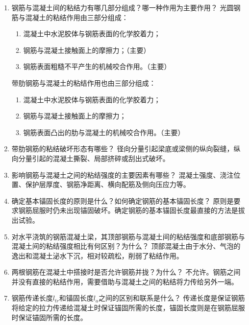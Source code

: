 \documentclass{article}
\begin{document}
\begin{enumerate}
\begin{enumerate}[1.]
                  \item 钢筋与混凝土间的粘结力有哪几部分组成？哪一种作用为主要作用？
                        \ans  光圆钢筋与混凝土的粘结作用由三部分组成：\begin{enumerate}
                              \item 混凝土中水泥胶体与钢筋表面的化学胶着力；
                              \item 钢筋与混凝土接触面上的摩擦力；（主要）
                              \item 钢筋表面粗糙不平产生的机械咬合作用。（主要）
                        \end{enumerate}
                        \par 带肋钢筋与混凝土的粘结作用也由三部分组成：\begin{enumerate}
                              \item 混凝土中水泥胶体与钢筋表面的化学胶着力；
                              \item 钢筋与混凝土接触面上的摩擦力；
                              \item 钢筋表面凸出的肋与混凝土的机械咬合作用。（主要）
                        \end{enumerate}
                  \item 带肋钢筋的粘结破坏形态有哪些？
                        \ans  径向分量引起梁底或梁侧的纵向裂缝，纵向分量引起的混凝土撕裂、局部挤碎或刮出式破坏。
                  \item 影响钢筋与混凝土之间的粘结强度的主要因素有哪些？
                        \ans  混凝土强度、浇注位置、保护层厚度、钢筋净距离、横向配筋及侧向压应力等。
                  \item 确定基本锚固长度的原则是什么？如何确定钢筋的基本锚固长度？
                        \ans  原则是要求钢筋屈服时仍未出现锚固破坏。确定钢筋的基本锚固长度最直接的方法是拔出试验。
                  \item 对水平浇筑的钢筋混凝土梁，其顶部钢筋与混凝土间的粘结强度和底部钢筋与混凝土间的粘结强度相比有何区别？为什么？
                        \ans 顶部混凝土由于水分、气泡的逸出和混凝土泌水下沉，相对较疏松，削弱了粘结作用。
                  \item 两根钢筋在混凝土中搭接时是否允许钢筋并拢？为什么？
                        \ans 不允许。钢筋之间并没有直接的粘结作用，需要借助与混凝土之间的粘结将力传给另外一端。
                  \item 钢筋传递长度$l_{tr}$和锚固长度$l_a$之间的区别和联系是什么？
                        \ans 传递长度是保证钢筋将给定的拉力传递给混凝土时保证锚固所需的长度，锚固长度则是在钢筋屈服时保证锚固所需的长度。

\end{enumerate}
\end{enumerate}
\end{document}
